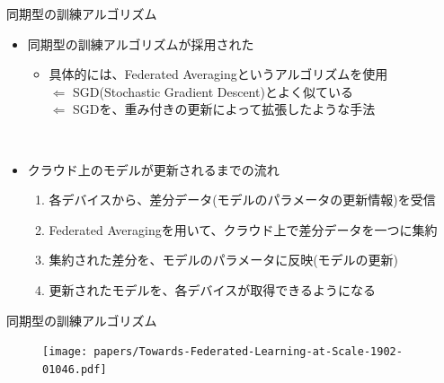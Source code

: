 \documentclass[dvipdfmx,notheorems,t]{beamer}
\begin{document}
\begin{frame}{同期型の訓練アルゴリズム}

\begin{itemize}
	\item \alert{同期型}の訓練アルゴリズムが採用された
	\begin{itemize}
		\item 具体的には、\alert{Federated Averaging}というアルゴリズムを使用 \\
		$\Leftarrow$ SGD(Stochastic Gradient Descent)とよく似ている \\
		$\Leftarrow$ SGDを、重み付きの更新によって拡張したような手法
	\end{itemize} \
	
	\item クラウド上のモデルが更新されるまでの流れ
	\begin{enumerate}
		\item 各デバイスから、差分データ(モデルのパラメータの更新情報)を受信
		\newline
		\item \alert{Federated Averaging}を用いて、クラウド上で差分データを一つに集約
		\newline
		\item 集約された差分を、モデルのパラメータに反映(モデルの更新)
		\newline
		\item 更新されたモデルを、各デバイスが取得できるようになる
	\end{enumerate}
\end{itemize}

\end{frame}

\begin{frame}{同期型の訓練アルゴリズム}

\begin{figure}
	\centering
	\texttt{[image: papers/Towards-Federated-Learning-at-Scale-1902-01046.pdf]}
	\label{fig:fl-averaging-algorithm}
\end{figure}

\end{frame}
\end{document}
